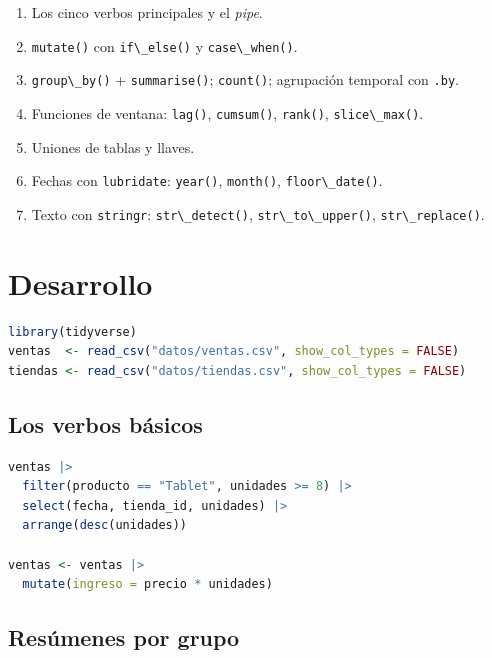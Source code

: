 \begin{enumerate}
\def\labelenumi{\arabic{enumi}.}
\tightlist
\item
  Los cinco verbos principales y el \emph{pipe}.
\item
  \passthrough{\lstinline!mutate()!} con
  \passthrough{\lstinline!if\_else()!} y
  \passthrough{\lstinline!case\_when()!}.
\item
  \passthrough{\lstinline!group\_by()!} +
  \passthrough{\lstinline!summarise()!};
  \passthrough{\lstinline!count()!}; agrupación temporal con
  \passthrough{\lstinline!.by!}.
\item
  Funciones de ventana: \passthrough{\lstinline!lag()!},
  \passthrough{\lstinline!cumsum()!}, \passthrough{\lstinline!rank()!},
  \passthrough{\lstinline!slice\_max()!}.
\item
  Uniones de tablas y llaves.
\item
  Fechas con \passthrough{\lstinline!lubridate!}:
  \passthrough{\lstinline!year()!}, \passthrough{\lstinline!month()!},
  \passthrough{\lstinline!floor\_date()!}.
\item
  Texto con \passthrough{\lstinline!stringr!}:
  \passthrough{\lstinline!str\_detect()!},
  \passthrough{\lstinline!str\_to\_upper()!},
  \passthrough{\lstinline!str\_replace()!}.
\end{enumerate}

\section{Desarrollo}

\begin{lstlisting}[language=R]
library(tidyverse)
ventas  <- read_csv("datos/ventas.csv", show_col_types = FALSE)
tiendas <- read_csv("datos/tiendas.csv", show_col_types = FALSE)
\end{lstlisting}

\subsection{Los verbos básicos}

\begin{lstlisting}[language=R]
ventas |>
  filter(producto == "Tablet", unidades >= 8) |>
  select(fecha, tienda_id, unidades) |>
  arrange(desc(unidades))

ventas <- ventas |>
  mutate(ingreso = precio * unidades)
\end{lstlisting}

\subsection{Resúmenes por grupo}

